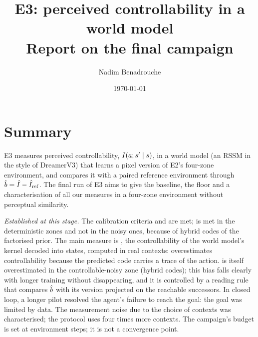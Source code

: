 \documentclass[10pt]{article}
\title{E3: perceived controllability in a world model\\[2pt]\large Report on the final campaign}
\author{Nadim Benadrouche}
\date{\today}
\begin{document}
\maketitle

\section*{Summary}

E3 measures perceived controllability, $I(a;s'\mid s)$, in a world model (an RSSM in the style of DreamerV3) that
learns a pixel version of E2's four-zone environment, and compares it with a paired reference environment through
$\hat{b} = \hat{I} - \hat{I}_{\mathrm{ref}}$.
The final run of E3 aims to give the baseline, the floor and a characterisation of all our measures in a four-zone
environment without perceptual similarity.

\emph{Established at this stage.}
The calibration criteria \Ca{} and \Cc{} are met; \Cb{} is met in the deterministic zones and not in the noisy ones,
because of hybrid codes of the factorised prior.
The main measure is \Is{}, the controllability of the world model's kernel decoded into states, computed in real
contexts: \Iz{} overestimates controllability because the predicted code carries a trace of the action.
\Is{} is itself overestimated in the controllable-noisy zone (hybrid codes); this bias falls clearly with longer
training without disappearing, and it is controlled by a reading rule that compares $\hat{b}$ with its version projected
on the reachable successors.
In closed loop, a longer pilot resolved the agent's failure to reach the goal: the goal was limited by data.
The measurement noise due to the choice of contexts was characterised; the protocol uses four times more contexts.
The campaign's budget is set at \eThreeBudget{} environment steps; it is not a convergence point.
\end{document}
